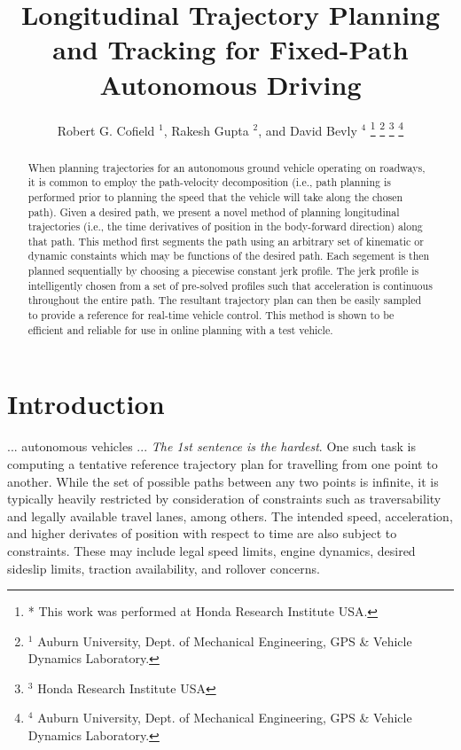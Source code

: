 \documentclass[letterpaper, 10 pt, conference]{ieeeconf}  %
\title{\LARGE \bf
  Longitudinal Trajectory Planning and Tracking for Fixed-Path Autonomous Driving
}
\author{
  Robert G. Cofield $^{1}$,
  Rakesh Gupta $^{2}$,
  and
  David Bevly $^{4}$
  \thanks{
    * This work was performed at Honda Research Institute USA.
  }
  \thanks{
    $^{1}$ Auburn University, Dept. of Mechanical Engineering, GPS \& Vehicle Dynamics Laboratory.
  }
  \thanks{
    $^{3}$ Honda Research Institute USA
  }
  \thanks{
    $^{4}$ Auburn University, Dept. of Mechanical Engineering, GPS \& Vehicle Dynamics Laboratory.
  }
}
\begin{document}
\maketitle
\thispagestyle{empty}
\pagestyle{empty}

\begin{abstract}

When planning trajectories for an autonomous ground vehicle operating on roadways, it is common to employ the path-velocity decomposition (i.e., path planning is performed prior to planning the speed that the vehicle will take along the chosen path).
Given a desired path, we present a novel method of planning longitudinal trajectories (i.e., the time derivatives of position in the body-forward direction) along that path.
This method first segments the path using an arbitrary set of kinematic or dynamic constaints which may be functions of the desired path.
Each segement is then planned sequentially by choosing a piecewise constant jerk profile.
The jerk profile is intelligently chosen from a set of pre-solved profiles such that acceleration is continuous throughout the entire path.
The resultant trajectory plan can then be easily sampled to provide a reference for real-time vehicle control.
This method is shown to be efficient and reliable for use in online planning with a test vehicle.

\end{abstract}

\section{Introduction} \label{sec:introduction}

... autonomous vehicles ... \emph{The 1st sentence is the hardest}.
One such task is computing a tentative reference trajectory plan for travelling from one point to another.
While the set of possible paths between any two points is infinite, it is typically heavily restricted by consideration of constraints such as traversability and legally available travel lanes, among others.
The intended speed, acceleration, and higher derivates of position with respect to time are also subject to constraints.
These may include legal speed limits, engine dynamics, desired sideslip limits, traction availability, and rollover concerns.
\end{document}
